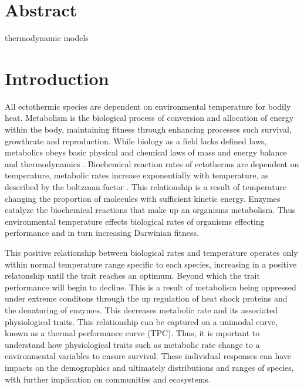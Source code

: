 \documentclass[11pt]{article}
\begin{document}
	\linenumbers
	\doublespacing
	
	\tableofcontents

	\newpage
	\section{Abstract}
	
	thermodynamic models
	
	\section{Introduction}
	All ectothermic species are dependent on environmental temperature for bodily heat. Metabolism is the biological process of conversion and allocation of energy within the body, maintaining fitness through enhancing processes such survival, growthrate and reproduction. While biology as a field lacks defined laws, metabolics obeys basic physical and chemical laws of mass and energy balance and thermodynamics \cite{brown2004toward}. Biochemical reaction rates of ectotherms are dependent on temperature, metabolic rates increase exponentially with temperature, as described by the boltzman  factor \citep{boltzman1872sitzungsber}. This relationship is a result of temperature changing the proportion of molecules with sufficient kinetic energy. Enzymes catalyze the biochemical reactions that make up an organisms metabolism. Thus environmental temperature effects biological rates of organisms effecting performance and in turn increasing Darwinian fitness. 
	
	This positive relationship between biological rates and temperature operates only within normal temperature range specific to each species, increasing in a positive relatonship until the trait reaches an optimum. Beyond which the trait performance will begin to decline. This is a result of metabolism being oppressed under extreme conditons through the up regulation of heat shock proteins and the denaturing of enzymes. This decreases metabolic rate and its associated physiological traits. This relationship can be captured on a unimodal curve, known as a thermal performance curve (TPC). Thus, it is mportant to understand how physiological traits such as metabolic rate  change to a environmental variables to ensure survival. These individual responses can have impacts on the demographics and ultimately distributions and ranges of species, with further implication on communities and ecosystems. 
	
\end{document}
